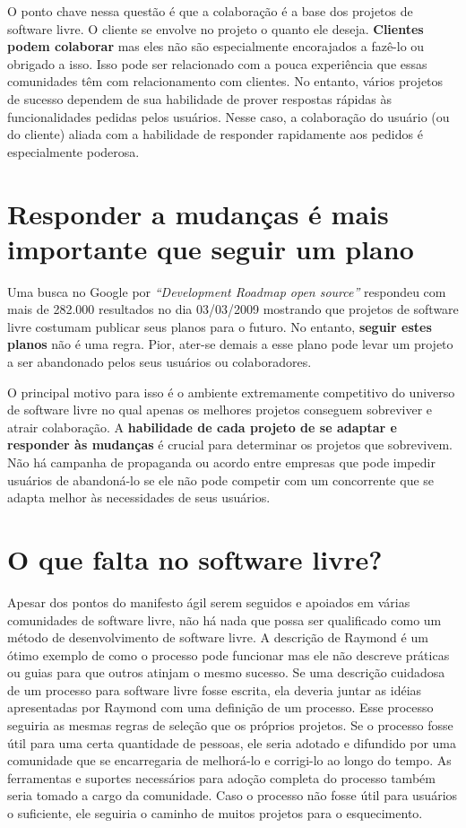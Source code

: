 O ponto chave nessa questão é que a colaboração é a base dos projetos
de software livre.  O cliente se envolve no projeto o quanto ele
deseja. \textbf{Clientes podem colaborar} mas eles não são
especialmente encorajados a fazê-lo ou obrigado a isso. Isso pode ser
relacionado com a pouca experiência que essas comunidades têm com
relacionamento com clientes. No entanto, vários projetos de sucesso
dependem de sua habilidade de prover respostas rápidas às
funcionalidades pedidas pelos usuários. Nesse caso, a colaboração do
usuário (ou do cliente) aliada com a habilidade de responder
rapidamente aos pedidos é especialmente poderosa.

\section{Responder a mudanças é mais importante que seguir um plano}
\label{sec:fourth-princ}

Uma busca no Google por \emph{``Development Roadmap open source''}
respondeu com mais de 282.000 resultados no dia 03/03/2009 mostrando
que projetos de software livre costumam publicar seus planos para o
futuro. No entanto, \textbf{seguir estes planos} não é uma
regra. Pior, ater-se demais a esse plano pode levar um projeto a ser
abandonado pelos seus usuários ou colaboradores.

O principal motivo para isso é o ambiente extremamente competitivo do
universo de software livre no qual apenas os melhores projetos
conseguem sobreviver e atrair colaboração. A \textbf{habilidade de
  cada projeto de se adaptar e responder às mudanças} é crucial para
determinar os projetos que sobrevivem. Não há campanha de propaganda
ou acordo entre empresas que pode impedir usuários de abandoná-lo se
ele não pode competir com um concorrente que se adapta melhor às
necessidades de seus usuários.

\section{O que falta no software livre?}
\label{sec:os-summary}

Apesar dos pontos do manifesto ágil serem seguidos e apoiados em
várias comunidades de software livre, não há nada que possa ser
qualificado como um método de desenvolvimento de software livre. A
descrição de Raymond \cite{Raymond1999} é um ótimo exemplo de como o
processo pode funcionar mas ele não descreve práticas ou guias para
que outros atinjam o mesmo sucesso. Se uma descrição cuidadosa de um
processo para software livre fosse escrita, ela deveria juntar as
idéias apresentadas por Raymond com uma definição de um processo. Esse
processo seguiria as mesmas regras de seleção que os próprios
projetos. Se o processo fosse útil para uma certa quantidade de
pessoas, ele seria adotado e difundido por uma comunidade que se
encarregaria de melhorá-lo e corrigi-lo ao longo do tempo. As
ferramentas e suportes necessários para adoção completa do processo
também seria tomado a cargo da comunidade. Caso o processo não fosse
útil para usuários o suficiente, ele seguiria o caminho de muitos
projetos para o esquecimento.

